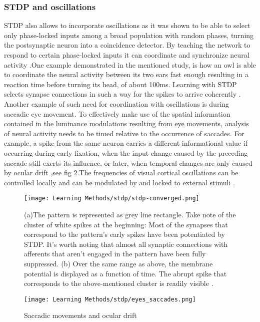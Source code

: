 \documentclass[12pt]{report}
\begin{document}
\subsubsection{STDP and oscillations}

STDP also allows to incorporate oscillations as it was shown to be able to select only phase-locked inputs among a broad population with random phases, turning the postsynaptic neuron into a coincidence detector. By teaching the network to respond to certain phase-locked inputs it can coordinate and synchronize neural activity \cite{Gerstner1996}.One example demonstrated in the mentioned study, is how an owl is able to coordinate the neural activity between its two ears fast enough resulting in a reaction time before turning its head, of about 100ms. Learning with STDP selects synapse connections in such a way for the spikes to arrive coherently . Another example of such need for coordination with oscillations is during saccadic eye movement.  To effectively make use of the spatial information contained in the luminance modulations resulting from eye movements, analysis of neural activity needs to be timed relative to the occurrence of saccades. For example, a spike from the same neuron carries a different informational value if occurring during early fixation, when the input change caused by the preceding saccade still exerts its influence, or later, when temporal changes are only caused by ocular drift \cite{Rucci2018},see fig \ref{fig:eyes_saccades}.The frequencies of visual cortical oscillations can be controlled locally  and  can  be  modulated  by  and locked to external stimuli \cite{Ahissar2012}.


\begin{figure}[htp]
    \centering
    \texttt{[image: Learning Methods/stdp/stdp-converged.png]}
    \caption{(a)The pattern is represented as grey line rectangle. Take note of the cluster of white spikes at the beginning: Most of the synapses that correspond to the pattern's early spikes have been potentiated by STDP. It's worth noting that almost all synaptic connections with afferents that aren't engaged in the pattern have been fully suppressed. (b) Over the same range as above, the membrane potential is displayed as a function of time. The abrupt spike that corresponds to the above-mentioned cluster is readily visible \cite{Masquelier2008}. 
    \label{fig:stdp-converged}}
\end{figure}

\begin{figure}[htp]
    \centering
    \texttt{[image: Learning Methods/stdp/eyes\_saccades.png]}
    \caption{Saccadic movements and ocular drift}
    \label{fig:eyes_saccades}
\end{figure}
\end{document}
